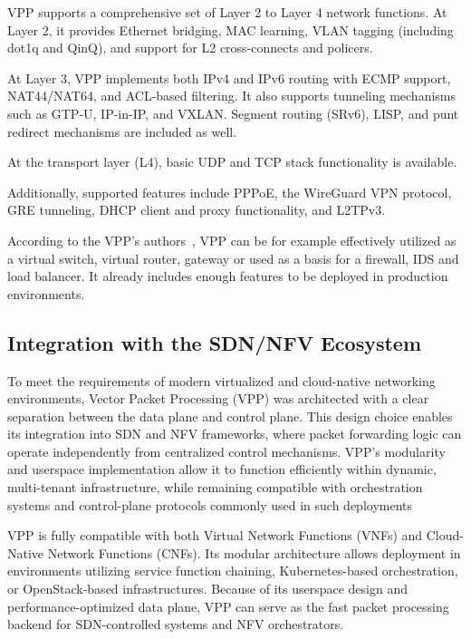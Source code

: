 VPP supports a comprehensive set of Layer 2 to Layer 4 network functions. 
At Layer 2, it provides Ethernet bridging, MAC learning, VLAN tagging (including dot1q and QinQ), and support for L2 cross-connects and policers.

At Layer 3, VPP implements both IPv4 and IPv6 routing with ECMP support, NAT44/NAT64, and ACL-based filtering. 
It also supports tunneling mechanisms such as GTP-U, IP-in-IP, and VXLAN. Segment routing (SRv6), LISP, and punt redirect mechanisms are included as well.

At the transport layer (L4), basic UDP and TCP stack functionality is available. 

Additionally, supported features include PPPoE, the WireGuard VPN protocol, GRE tunneling, DHCP client and proxy functionality, and L2TPv3.\cite{fdio-vpp-features-2502}

According to the VPP's authors~\cite{fdio_what_is_vpp}, VPP can be for example effectively utilized as a virtual switch, virtual router, gateway or used as a basis for a firewall, IDS and load balancer.
It already includes enough features to be deployed in production environments.


\subsection{Integration with the SDN/NFV Ecosystem}
To meet the requirements of modern virtualized and cloud-native networking environments, Vector Packet Processing (VPP) was architected with a clear separation between the data plane and control plane. 
This design choice enables its integration into SDN and NFV frameworks, where packet forwarding logic can operate independently from centralized control mechanisms. 
VPP's modularity and userspace implementation allow it to function efficiently within dynamic, multi-tenant infrastructure, 
while remaining compatible with orchestration systems and control-plane protocols commonly used in such deployments

VPP is fully compatible with both Virtual Network Functions (VNFs) and Cloud-Native Network Functions (CNFs). 
Its modular architecture allows deployment in environments utilizing service function chaining, Kubernetes-based orchestration, or OpenStack-based infrastructures. 
Because of its userspace design and performance-optimized data plane, VPP can serve as the fast packet processing backend for SDN-controlled systems and NFV orchestrators.\cite{fdio2017whitepaper}

